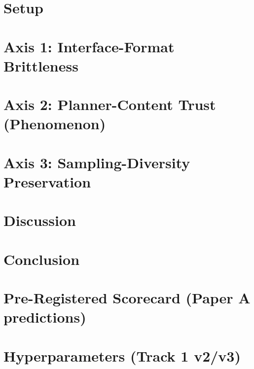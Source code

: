 \documentclass[11pt]{article}
\begin{document}
\section{Setup}


\section{Axis 1: Interface-Format Brittleness}
\label{sec:axis1}


\section{Axis 2: Planner-Content Trust (Phenomenon)}
\label{sec:axis2}


\section{Axis 3: Sampling-Diversity Preservation}
\label{sec:axis3}


\section{Discussion}
\label{sec:discussion}


\section{Conclusion}





\appendix

\section{Pre-Registered Scorecard (Paper A predictions)}
\label{app:prereg}


\section{Hyperparameters (Track 1 v2/v3)}
\label{app:hyperparams}

\end{document}
